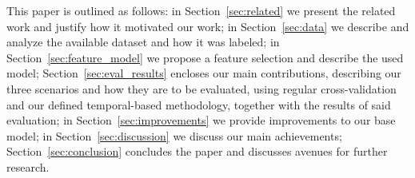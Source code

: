 This paper is outlined as follows: in Section~\ref{sec:related} we present
the related work and justify how it motivated our work; in Section~\ref{sec:data} we describe and analyze the available dataset and how it was labeled; in Section~\ref{sec:feature_model} we propose a feature selection and describe the used model; Section~\ref{sec:eval_results} encloses our main contributions, describing our three scenarios and how they are to be evaluated, using regular cross-validation and our defined temporal-based methodology, together with the results of said evaluation;
in Section~\ref{sec:improvements} we provide improvements to our base model; in Section~\ref{sec:discussion} we discuss our main achievements; Section~\ref{sec:conclusion} concludes the paper and discusses avenues for further research.
